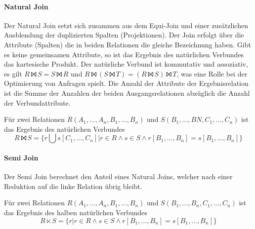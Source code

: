 \documentclass{scrbook}
\begin{document}
% 
% 
%


\paragraph{Natural Join}
Der Natural Join setzt sich zusammen aus dem Equi-Join und einer zusätzlichen Ausblendung
der duplizierten Spalten (Projektionen).
Der Join erfolgt über die Attribute (Spalten) die in beiden
Relationen die gleiche Bezeichnung haben.
Gibt es keine gemeinsamen Attribute, so ist das Ergebnis des natürlichen Verbundes
das kartesische Produkt.
Der natürliche Verbund ist kommutativ und assoziativ,
es gilt $R⨝S = S⨝R$ und $R⨝(S⨝T) = (R ⨝ S) ⨝ T$,
was eine Rolle bei der Optimierung von Anfragen spielt.
Die Anzahl der Attribute der Ergebnisrelation ist die Summe der 
Anzahlen der beiden Ausgangsrelationen abzüglich die Anzahl der Verbundattribute.

\begin{definition} 

Für zwei Relationen $R(A_1, \dots, A_n, B_1, \dots, B_n)$
und $S(B_1, \dots, BN, C_1, \dots, C_n)$ ist das Ergebnis des natürlichen Verbundes
\begin{displaymath}
R⨝S = \{ r ⋃ s[C_1,\dots,C_n] | r ∈ R ∧ s ∈ S ∧ r[B_1,\dots,B_n] = s[B_1,\dots,B_n] \}
\end{displaymath}

\end{definition}

% 
%
%
%


\paragraph{Semi Join}

Der Semi Join berechnet den Anteil eines Natural Joins, welcher nach einer
Reduktion auf die linke Relation übrig bleibt.

\begin{definition}
Für zwei Relationen $R(A_1, \dots, A_n,B_1, \dots, B_n)$ und 
$S(B_1, \dots, B_n,C_1, \dots, C_n)$ ist das Ergebnis des halben 
natürlichen Verbundes
\begin{displaymath}
R ⋉ S = \{ r | r ∈ R ∧ s ∈ S ∧ r[B_1, \dots, B_n] = s[B_1, \dots, B_n] \}
\end{displaymath}
\end{definition}
\end{document}
